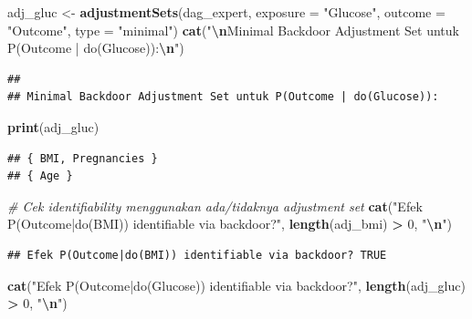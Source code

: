 \documentclass[
  11pt,
]{article}
\newenvironment{Shaded}{\begin{snugshade}}{\end{snugshade}}
\newcommand{\AttributeTok}[1]{\textcolor[rgb]{0.13,0.29,0.53}{#1}}
\newcommand{\CommentTok}[1]{\textcolor[rgb]{0.56,0.35,0.01}{\textit{#1}}}
\newcommand{\DecValTok}[1]{\textcolor[rgb]{0.00,0.00,0.81}{#1}}
\newcommand{\FunctionTok}[1]{\textcolor[rgb]{0.13,0.29,0.53}{\textbf{#1}}}
\newcommand{\NormalTok}[1]{#1}
\newcommand{\OtherTok}[1]{\textcolor[rgb]{0.56,0.35,0.01}{#1}}
\newcommand{\SpecialCharTok}[1]{\textcolor[rgb]{0.81,0.36,0.00}{\textbf{#1}}}
\newcommand{\StringTok}[1]{\textcolor[rgb]{0.31,0.60,0.02}{#1}}
\begin{document}
\begin{Shaded}
\begin{Highlighting}[]
\NormalTok{adj\_gluc }\OtherTok{\textless{}{-}} \FunctionTok{adjustmentSets}\NormalTok{(dag\_expert,}
                            \AttributeTok{exposure =} \StringTok{"Glucose"}\NormalTok{,}
                            \AttributeTok{outcome  =} \StringTok{"Outcome"}\NormalTok{,}
                            \AttributeTok{type     =} \StringTok{"minimal"}\NormalTok{)}
\FunctionTok{cat}\NormalTok{(}\StringTok{"}\SpecialCharTok{\textbackslash{}n}\StringTok{Minimal Backdoor Adjustment Set untuk P(Outcome | do(Glucose)):}\SpecialCharTok{\textbackslash{}n}\StringTok{"}\NormalTok{)}
\end{Highlighting}
\end{Shaded}

\begin{verbatim}
## 
## Minimal Backdoor Adjustment Set untuk P(Outcome | do(Glucose)):
\end{verbatim}

\begin{Shaded}
\begin{Highlighting}[]
\FunctionTok{print}\NormalTok{(adj\_gluc)}
\end{Highlighting}
\end{Shaded}

\begin{verbatim}
## { BMI, Pregnancies }
## { Age }
\end{verbatim}

\begin{Shaded}
\begin{Highlighting}[]
\CommentTok{\# Cek identifiability menggunakan ada/tidaknya adjustment set}
\FunctionTok{cat}\NormalTok{(}\StringTok{"Efek P(Outcome|do(BMI)) identifiable via backdoor?"}\NormalTok{,}
    \FunctionTok{length}\NormalTok{(adj\_bmi) }\SpecialCharTok{\textgreater{}} \DecValTok{0}\NormalTok{, }\StringTok{"}\SpecialCharTok{\textbackslash{}n}\StringTok{"}\NormalTok{)}
\end{Highlighting}
\end{Shaded}

\begin{verbatim}
## Efek P(Outcome|do(BMI)) identifiable via backdoor? TRUE
\end{verbatim}

\begin{Shaded}
\begin{Highlighting}[]
\FunctionTok{cat}\NormalTok{(}\StringTok{"Efek P(Outcome|do(Glucose)) identifiable via backdoor?"}\NormalTok{,}
    \FunctionTok{length}\NormalTok{(adj\_gluc) }\SpecialCharTok{\textgreater{}} \DecValTok{0}\NormalTok{, }\StringTok{"}\SpecialCharTok{\textbackslash{}n}\StringTok{"}\NormalTok{)}
\end{Highlighting}
\end{Shaded}
\end{document}
